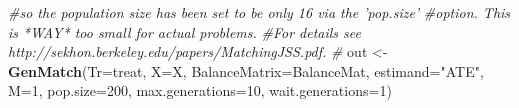 \documentclass[]{article}
\newenvironment{Shaded}{\begin{snugshade}}{\end{snugshade}}
\newcommand{\CommentTok}[1]{\textcolor[rgb]{0.56,0.35,0.01}{\textit{#1}}}
\newcommand{\DataTypeTok}[1]{\textcolor[rgb]{0.13,0.29,0.53}{#1}}
\newcommand{\DecValTok}[1]{\textcolor[rgb]{0.00,0.00,0.81}{#1}}
\newcommand{\KeywordTok}[1]{\textcolor[rgb]{0.13,0.29,0.53}{\textbf{#1}}}
\newcommand{\NormalTok}[1]{#1}
\newcommand{\StringTok}[1]{\textcolor[rgb]{0.31,0.60,0.02}{#1}}
\begin{document}
\begin{Shaded}
\begin{Highlighting}[]
\CommentTok{#so the population size has been set to be only 16 via the 'pop.size'}
\CommentTok{#option. This is *WAY* too small for actual problems.}
\CommentTok{#For details see http://sekhon.berkeley.edu/papers/MatchingJSS.pdf.}
\CommentTok{#}
\NormalTok{out <-}\StringTok{ }\KeywordTok{GenMatch}\NormalTok{(}\DataTypeTok{Tr=}\NormalTok{treat, }\DataTypeTok{X=}\NormalTok{X, }\DataTypeTok{BalanceMatrix=}\NormalTok{BalanceMat, }\DataTypeTok{estimand=}\StringTok{"ATE"}\NormalTok{, }\DataTypeTok{M=}\DecValTok{1}\NormalTok{,}
                   \DataTypeTok{pop.size=}\DecValTok{200}\NormalTok{, }\DataTypeTok{max.generations=}\DecValTok{10}\NormalTok{, }\DataTypeTok{wait.generations=}\DecValTok{1}\NormalTok{)}
\end{Highlighting}
\end{Shaded}
\end{document}
